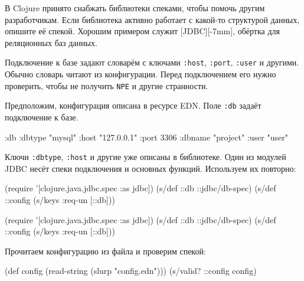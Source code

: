 
В Clojure принято снабжать библиотеки спеками, чтобы помочь другим
разработчикам. Если библиотека активно работает с какой-то структурой данных,
опишите её спекой. Хорошим примером служит
[JDBC][-7mm], обёртка для реляционных
баз данных.

Подключение к базе задают словарём с ключами \verb|:host|, \verb|:port|,
\verb|:user| и другими. Обычно словарь читают из конфигурации. Перед
подключением его нужно проверить, чтобы не получить \verb|NPE| и другие
странности.


Предположим, конфигурация описана в ресурсе EDN. Поле \verb|:db| задаёт
подключение к базе.


\begin{english}
  \begin{clojure}
{:db {:dbtype "mysql"
      :host "127.0.0.1"
      :port 3306
      :dbname "project"
      :user "user"}}
  \end{clojure}
\end{english}

Ключи \verb|:dbtype|, \verb|:host| и другие уже описаны в библиотеке. Один
из модулей JDBC несёт спеки подключения и основных функций. Используем их
повторно:

\ifx\devicetype\mobile

\begin{english}
  \begin{clojure}
(require
  '[clojure.java.jdbc.spec :as jdbc])
(s/def ::db ::jdbc/db-spec)
(s/def ::config (s/keys :req-un [::db]))
  \end{clojure}
\end{english}

\else

\begin{english}
  \begin{clojure}
(require '[clojure.java.jdbc.spec :as jdbc])
(s/def ::db ::jdbc/db-spec)
(s/def ::config (s/keys :req-un [::db]))
  \end{clojure}
\end{english}

\fi

\noindent
Прочитаем конфигурацию из файла и проверим спекой:

\ifx\devicetype\mobile

\begin{english}
  \begin{clojure}
(def config
  (read-string (slurp "config.edn")))
(s/valid? ::config config)
  \end{clojure}
\end{english}


